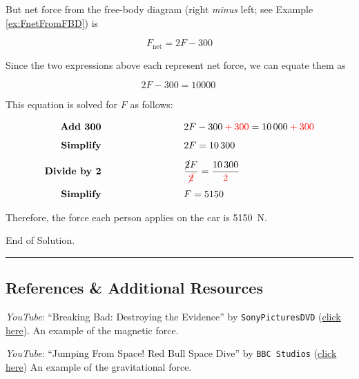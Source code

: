\documentclass{article}
\begin{document}
But net force from the free-body diagram (right \textit{minus} left; see Example \ref{ex:FnetFromFBD}) is

\begin{equation*}
    F_{\text{net}} = 2F - 300
\end{equation*}

Since the two expressions above each represent net force, we can equate them as

\begin{equation*}
    2F - 300 = \SI{10000}{}
\end{equation*}

This equation is solved for $F$ as follows:

\begin{align*}
    \textbf{Add 300} \hspace{9cm} 
    & \hspace{-6cm} 2F - 300 \mathbin{\textcolor{red}{+}} \textcolor{red}{300} = \SI{10000}{} \mathbin{\textcolor{red}{+}} \textcolor{red}{300}\\[1ex]
    \textbf{Simplify} \hspace{9cm}
    & \hspace{-6cm} 2F = \SI{10300}{}\\[1ex]
    \textbf{Divide by 2} \hspace{9cm}
    & \hspace{-6cm} \frac{\cancel{2}F}{\textcolor{red}{\cancel{2}}} = \frac{\SI{10300}{}}{\textcolor{red}{2}}\\[1ex]
    \textbf{Simplify} \hspace{9cm} 
    & \hspace{-6cm} F = 5150
\end{align*}

Therefore, the force each person applies on the car is \SI{5150}{N}.

End of Solution.

\vspace{1em}

\hrule


\subsection{References \& Additional Resources}

\textit{YouTube}: ``Breaking Bad: Destroying the Evidence'' by \texttt{SonyPicturesDVD} (\href{https://youtu.be/gzCXowhks80?t=3}{click here}). An example of the magnetic force.

\textit{YouTube}: ``Jumping From Space! Red Bull Space Dive'' by \texttt{BBC Studios} (\href{https://youtu.be/E9oKEJ1pXPw}{click here}) An example of the gravitational force.
\end{document}
